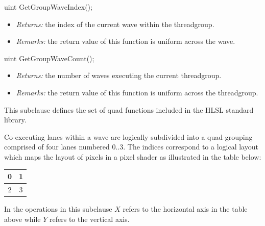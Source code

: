 \begin{HLSL}
uint GetGroupWaveIndex();
\end{HLSL}

\begin{itemize}
  \item \textit{Returns:} the index of the current \gls{wave} within the
  \gls{threadgroup}.
  \item \textit{Remarks:} the return value of this function is uniform across
  the \gls{wave}.
\end{itemize}

\begin{HLSL}
uint GetGroupWaveCount();
\end{HLSL}

\begin{itemize}
  \item \textit{Returns:} the number of \gls{wave}s executing the current
  \gls{threadgroup}.
  \item \textit{Remarks:} the return value of this function is uniform across
  the \gls{threadgroup}.
\end{itemize}


\p This subclause defines the set of \gls{quad} functions included in the
HLSL standard library.

\p Co-executing \gls{lane}s within a \gls{wave} are logically subdivided into a quad
grouping comprised of four \gls{lane}s numbered $0..3$. The indices correspond to a
logical layout which maps the layout of pixels in a pixel shader as illustrated
in the table below:

\begin{center}
  \begin{tabular}{| c | c |}
    \hline 0 & 1 \\
    \hline 2 & 3 \\
    \hline
  \end{tabular}
\end{center}

\p In the operations in this subclause $X$ refers to the horizontal axis in the
table above while $Y$ refers to the vertical axis.


